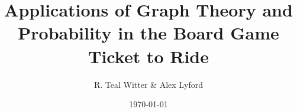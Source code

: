 \documentclass[manuscript]{acmart}
\begin{document}
\title{Applications of Graph Theory and Probability in the Board Game Ticket to Ride}

\author{R. Teal Witter \& Alex Lyford}

\date{\today}

\maketitle

\begin{multicols}{2}




 



\end{multicols}
\end{document}

